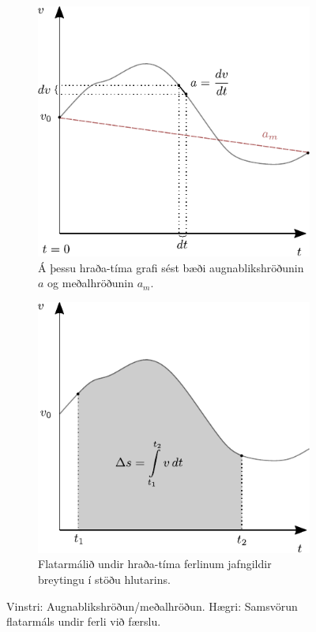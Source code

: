 \ifdefined \wholebook \else\documentclass[oneside]{book}\usepackage{EdlBook}\graphicspath{{figures/}}
\begin{document}
\begin{figure}[H]
    \centering
\begin{subfigure}[h]{.4\textwidth}
    \centering
    \includegraphics[width=\linewidth]{figures/hradatimagraf-hallatala.pdf}
    \caption{Á þessu hraða-tíma grafi sést bæði augnablikshröðunin $a$ og meðalhröðunin $a_m$.}
    \label{fig:vt-hradi}
\end{subfigure}
\hfill
\begin{subfigure}[h]{.4\textwidth}
    \centering
    \includegraphics[width=\linewidth]{figures/hradatimagraf-flatarmalid.pdf}
    \caption{Flatarmálið undir hraða-tíma ferlinum jafngildir breytingu í stöðu hlutarins.}
    \label{fig:vt-tegur}
\end{subfigure}
\caption{Vinstri: Augnablikshröðun/meðalhröðun. Hægri: Samsvörun flatarmáls undir ferli við færslu.}
\end{figure}
\end{document}
